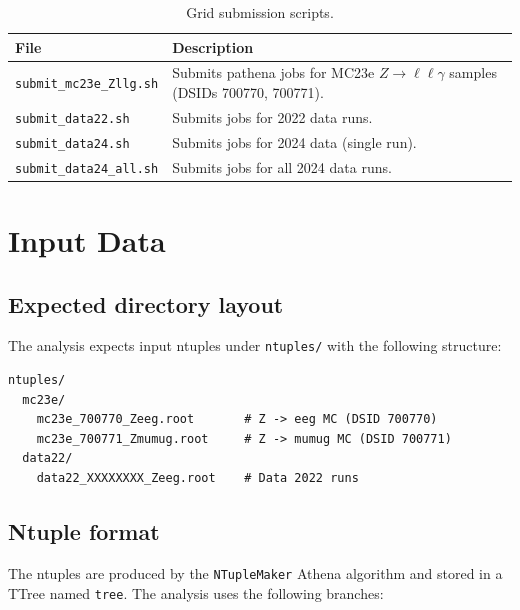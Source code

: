 \documentclass[12pt,a4paper]{article}
\begin{document}
\begin{table}[htbp]
\centering
\caption{Grid submission scripts.}
\label{tab:scripts:grid}
\small
\begin{tabular}{lp{9cm}}
\toprule
\textbf{File} & \textbf{Description} \\
\midrule
\texttt{submit\_mc23e\_Zllg.sh}
  & Submits pathena jobs for MC23e $Z\to\ell\ell\gamma$ samples
    (DSIDs 700770, 700771). \\
\texttt{submit\_data22.sh}
  & Submits jobs for 2022 data runs. \\
\texttt{submit\_data24.sh}
  & Submits jobs for 2024 data (single run). \\
\texttt{submit\_data24\_all.sh}
  & Submits jobs for all 2024 data runs. \\
\bottomrule
\end{tabular}
\end{table}

\section{Input Data}
\label{sec:input}

\subsection{Expected directory layout}

The analysis expects input ntuples under \texttt{ntuples/} with the
following structure:

\begin{lstlisting}
ntuples/
  mc23e/
    mc23e_700770_Zeeg.root       # Z -> eeg MC (DSID 700770)
    mc23e_700771_Zmumug.root     # Z -> mumug MC (DSID 700771)
  data22/
    data22_XXXXXXXX_Zeeg.root    # Data 2022 runs
\end{lstlisting}

\subsection{Ntuple format}

The ntuples are produced by the \texttt{NTupleMaker} Athena algorithm
and stored in a TTree named \texttt{tree}. The analysis uses the
following branches:
\end{document}
